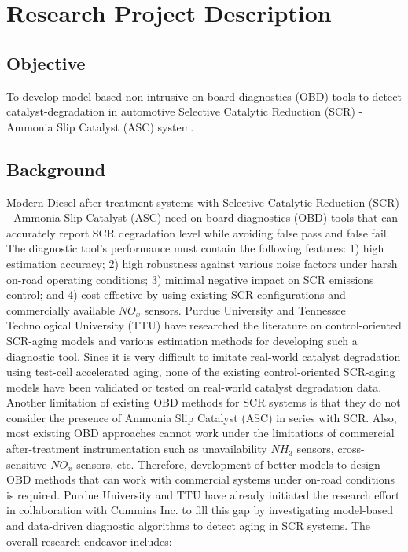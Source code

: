 \section{Research Project Description}

\subsection{Objective}
To develop model-based non-intrusive on-board diagnostics (OBD) tools to detect
catalyst-degradation in automotive Selective Catalytic Reduction (SCR) - Ammonia
Slip Catalyst (ASC) system.

\subsection{Background}
Modern Diesel after-treatment systems with Selective Catalytic Reduction (SCR)
- Ammonia Slip Catalyst (ASC) need on-board diagnostics (OBD) tools that can
accurately report SCR degradation level while avoiding false pass and false
fail. The diagnostic tool's performance must contain the following features: 1)
high estimation accuracy; 2) high robustness against various noise factors
under harsh on-road operating conditions; 3) minimal negative impact on SCR
emissions control; and 4) cost-effective by using existing SCR configurations
and commercially available $NO_x$ sensors. Purdue University and Tennessee
Technological University (TTU) have researched the literature on
control-oriented SCR-aging models and various estimation methods for developing
such a diagnostic tool. Since it is very difficult to imitate real-world
catalyst degradation using test-cell accelerated aging, none of the existing
control-oriented SCR-aging models have been validated or tested on real-world
catalyst degradation data. Another limitation of existing OBD methods for SCR
systems is that they do not consider the presence of Ammonia Slip Catalyst
(ASC) in series with SCR. Also, most existing OBD approaches cannot work under
the limitations of commercial after-treatment instrumentation such as
unavailability  $NH_3$ sensors, cross-sensitive $NO_x$ sensors, etc. Therefore,
development of better models to design OBD methods that can work with
commercial systems under on-road conditions is required. Purdue University and
TTU have already initiated the research effort in collaboration with Cummins
Inc. to fill this gap by investigating model-based and data-driven diagnostic
algorithms to detect aging in SCR systems. The overall research endeavor
includes:

